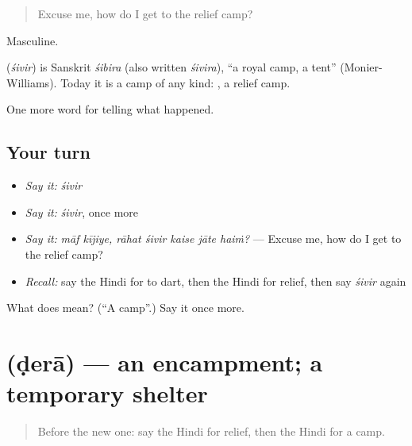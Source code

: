 \begin{quote}
Excuse me, how do I get to the relief camp?
\end{quote}

Masculine.

\begin{cousinweb}
\textbf{} (\emph{śivir}) is Sanskrit \emph{śibira} (also written \emph{śivira}), \textquotedblleft{}a royal camp, a tent\textquotedblright{} (Monier-Williams). Today it is a camp of any kind: \textbf{ }, a relief camp.
\end{cousinweb}

\begin{grammarlens}[title={What you've built}]
One more word for telling what happened.
\end{grammarlens}

\subsection*{Your turn}
\begin{itemize}
\raggedright
  \item \emph{Say it:} \emph{śivir}
  \item \emph{Say it:} \emph{śivir}, once more
  \item \emph{Say it:} \emph{māf kījiye, rāhat śivir kaise jāte haiṁ?} — Excuse me, how do I get to the relief camp?
  \item \emph{Recall:} say the Hindi for to dart, then the Hindi for relief, then say \emph{śivir} again
\end{itemize}

\begin{tcolorbox}[breakable,colback=teal!4,colframe=teal!35!black,title={Before you move on}]
What does  mean? (\textquotedblleft{}A camp\textquotedblright{}.) Say it once more.
\end{tcolorbox}
\section[\texorpdfstring{\hi{डेरा} (ḍerā)}{डेरा (ḍerā)}]{ (ḍerā) — an encampment; a temporary shelter}

\label{lesson:HI-C309-dera}



\begin{quote}
Before the new one: say the Hindi for relief, then the Hindi for a camp.
\end{quote}


